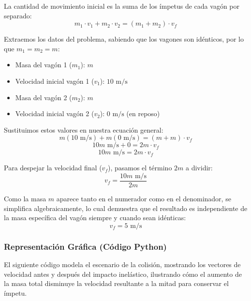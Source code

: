 \documentclass{article}
\begin{document}
La cantidad de movimiento inicial es la suma de los ímpetus de cada vagón por separado:
$$m_1 \cdot v_1 + m_2 \cdot v_2 = (m_1 + m_2) \cdot v_f$$

Extraemos los datos del problema, sabiendo que los vagones son idénticos, por lo que $m_1 = m_2 = m$:
\begin{itemize}
    \item Masa del vagón 1 ($m_1$): $m$
    \item Velocidad inicial vagón 1 ($v_1$): $10 \text{ m/s}$
    \item Masa del vagón 2 ($m_2$): $m$
    \item Velocidad inicial vagón 2 ($v_2$): $0 \text{ m/s}$ (en reposo)
\end{itemize}

Sustituimos estos valores en nuestra ecuación general:
$$m(10 \text{ m/s}) + m(0 \text{ m/s}) = (m + m) \cdot v_f$$
$$10m \text{ m/s} + 0 = 2m \cdot v_f$$
$$10m \text{ m/s} = 2m \cdot v_f$$

Para despejar la velocidad final ($v_f$), pasamos el término $2m$ a dividir:
$$v_f = \frac{10m \text{ m/s}}{2m}$$

Como la masa $m$ aparece tanto en el numerador como en el denominador, se simplifica algebraicamente, lo cual demuestra que el resultado es independiente de la masa específica del vagón siempre y cuando sean idénticas:
$$v_f = 5 \text{ m/s}$$

\subsubsection*{Representación Gráfica (Código Python)}
El siguiente código modela el escenario de la colisión, mostrando los vectores de velocidad antes y después del impacto inelástico, ilustrando cómo el aumento de la masa total disminuye la velocidad resultante a la mitad para conservar el ímpetu.
\end{document}
